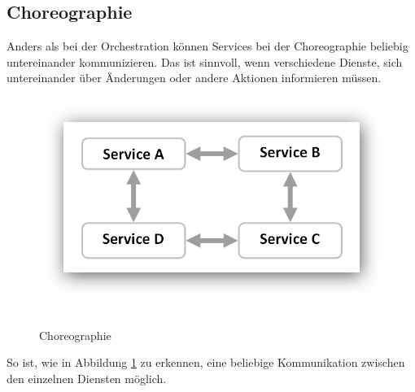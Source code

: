 \subsection*{Choreographie}
\label{subsec:choreographie}
Anders als bei der Orchestration können Services bei der Choreographie beliebig untereinander kommunizieren. Das ist sinnvoll, wenn verschiedene Dienste, sich untereinander über Änderungen oder andere Aktionen informieren müssen.
\newpage
\begin{figure}[htb]
    \centering 
    \includegraphics[width=\linewidth]{content/images/ServiceChoreography}\
    \caption[Choreographie]{Choreographie}
    \label{fig:ServiceChoreography}  
\end{figure}
So ist, wie in Abbildung \ref{fig:ServiceChoreography} zu erkennen, eine beliebige Kommunikation zwischen den einzelnen Diensten möglich.